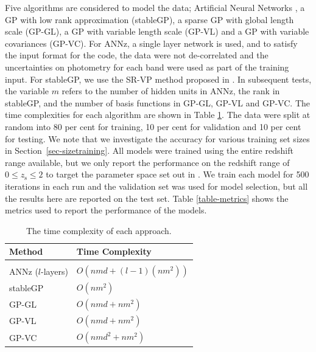 \documentclass[useAMS,usenatbib,fleqn]{mn2e}
\begin{document}
Five algorithms are considered to model the data; Artificial Neural Networks \citep[{\sc ANNz};][]{Collister04}, a GP with low rank approximation ({\sc stableGP}), a sparse GP with global length scale (GP-GL), a GP with variable length scale (GP-VL) and a GP with variable covariances (GP-VC). For {\sc ANNz}, a single layer network is used, and to satisfy the input format for the code, the data were not de-correlated and the uncertainties on photometry for each band were used as part of the training input. For {\sc stableGP}, we use the SR-VP method proposed in \citep{foster2009}. In subsequent tests, the variable $m$ refers to the number of hidden units in {\sc ANNz}, the rank in {\sc stableGP}, and the number of basis functions in GP-GL, GP-VL and GP-VC. The time complexities for each algorithm are shown in Table \ref{table-time-complexity}. The data were split at random into 80 per cent for training, 10 per cent for validation and 10 per cent for testing. We note that we investigate the accuracy for various training set sizes in Section~\ref{sec-sizetraining}. All models were trained using the entire redshift range available, but we only report the performance on the redshift range of $0 \le z_\textrm{s} \le 2$ to target the parameter space set out in \cite{laureijs2011}. We train each model for 500 iterations in each run and the validation set was used for model selection, but all the results here are reported on the test set. Table \ref{table-metrics} shows the metrics used to report the performance of the models.

\begin{table}
\caption{The time complexity of each approach.}
\begin{center}
  \begin{tabular}{| l | l |}
     	Method		&	Time Complexity					\\	\hline				\\
	{\sc ANNz} ($l$-layers)			&	$O\left(nmd+(l-1)(nm^{2})\right)$					\\
	{\sc stableGP}		&	$O\left(nm^{2}\right)$				\\
	GP-GL		&	$O\left(nmd+nm^{2}\right)$		\\	
	GP-VL		&	$O\left(nmd+nm^{2}\right)$		\\	
	GP-VC		&	$O\left(nmd^{2}+nm^{2}\right)$	\\	\hline
  \end{tabular}
\end{center}
\label{table-time-complexity}
\end{table}
\end{document}
